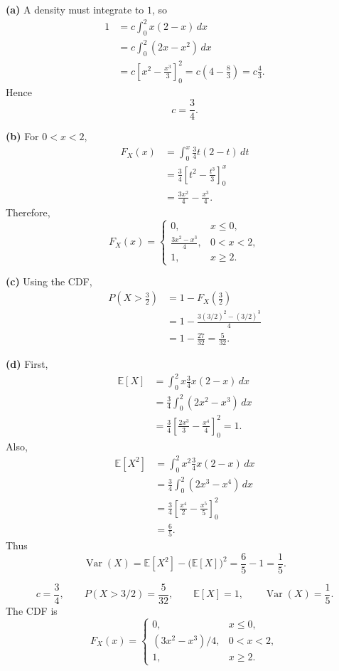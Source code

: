 \documentclass[11pt]{article}
\begin{document}
\begin{solutionbox}
\textbf{(a)} A density must integrate to $1$, so
\begin{align*}
1
&=c\int_0^2 x(2-x)\,dx\\
&=c\int_0^2(2x-x^2)\,dx\\
&=c\left[x^2-\frac{x^3}{3}\right]_0^2
=c\left(4-\frac83\right)
=c\frac43.
\end{align*}
Hence
\[
c=\frac34.
\]

\textbf{(b)} For $0<x<2$,
\begin{align*}
F_X(x)
&=\int_0^x \frac34t(2-t)\,dt\\
&=\frac34\left[t^2-\frac{t^3}{3}\right]_0^x\\
&=\frac{3x^2}{4}-\frac{x^3}{4}.
\end{align*}
Therefore,
\[
F_X(x)=
\begin{cases}
0, & x\leq 0,\\[2mm]
\displaystyle \frac{3x^2-x^3}{4}, & 0<x<2,\\[2mm]
1, & x\geq 2.
\end{cases}
\]

\textbf{(c)} Using the CDF,
\begin{align*}
P\left(X>\frac32\right)
&=1-F_X\left(\frac32\right)\\
&=1-\frac{3(3/2)^2-(3/2)^3}{4}\\
&=1-\frac{27}{32}
=\frac5{32}.
\end{align*}

\textbf{(d)} First,
\begin{align*}
\mathbb{E}[X]
&=\int_0^2 x\frac34x(2-x)\,dx\\
&=\frac34\int_0^2(2x^2-x^3)\,dx\\
&=\frac34\left[\frac{2x^3}{3}-\frac{x^4}{4}\right]_0^2
=1.
\end{align*}
Also,
\begin{align*}
\mathbb{E}[X^2]
&=\int_0^2 x^2\frac34x(2-x)\,dx\\
&=\frac34\int_0^2(2x^3-x^4)\,dx\\
&=\frac34\left[\frac{x^4}{2}-\frac{x^5}{5}\right]_0^2\\
&=\frac65.
\end{align*}
Thus
\[
\operatorname{Var}(X)=\mathbb{E}[X^2]-\bigl(\mathbb{E}[X]\bigr)^2
=\frac65-1=\frac15.
\]

\begin{finalanswerbox}
\[
 {c=\frac34},\qquad
 {P(X>3/2)=\frac5{32}},\qquad
 {\mathbb{E}[X]=1},\qquad
 {\operatorname{Var}(X)=\frac15}.
\]
The CDF is
\[
 {
F_X(x)=
\begin{cases}
0, & x\leq 0,\\
(3x^2-x^3)/4, & 0<x<2,\\
1, & x\geq 2.
\end{cases}}
\]
\end{finalanswerbox}
\end{solutionbox}
 
\end{document}
